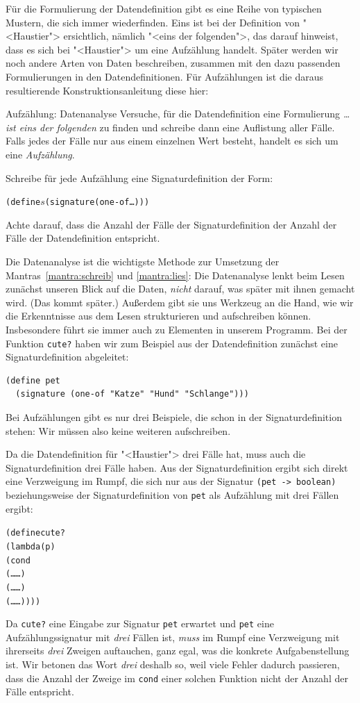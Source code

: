 Für die Formulierung der Datendefinition gibt es eine Reihe von
typischen Mustern, die sich immer wiederfinden.  Eins ist bei der
Definition von "<Haustier"> ersichtlich, nämlich "<eins der
folgenden">, das darauf hinweist, dass es sich bei "<Haustier"> um
eine Aufzählung handelt.  Später werden wir noch andere Arten
von Daten beschreiben, zusammen mit den dazu passenden Formulierungen
in den Datendefinitionen.  Für Aufzählungen
ist die daraus resultierende Konstruktionsanleitung diese hier:
%
\begin{konstruktionsanleitung}{Aufzählung: Datenanalyse}
  \label{ka:aufzaehlung}
  Versuche, für die Datendefinition eine Formulierung \emph{\ldots{}
    ist eins der folgenden} zu finden und schreibe dann eine
  Auflistung aller Fälle.  Falls jedes der Fälle nur aus einem
  einzelnen Wert besteht, handelt es sich um eine
  \textit{Aufzählung}.

  Schreibe für jede Aufzählung eine Signaturdefinition der Form:
\begin{alltt}
(define \(s\) (signature (one-of \ldots)))
\end{alltt}
  Achte darauf, dass die Anzahl der Fälle der Signaturdefinition der
  Anzahl der Fälle der Datendefinition entspricht.
\end{konstruktionsanleitung}
%
Die Datenanalyse ist die wichtigste Methode zur Umsetzung der
Mantras~\ref{mantra:schreib} und \ref{mantra:lies}:
%
\mantraschreib*
%
\mantralies*
%
\noindent Die Datenanalyse lenkt beim Lesen zunächst unseren Blick auf die
Daten, \emph{nicht} darauf, was später mit ihnen gemacht wird.  (Das
kommt später.)  Außerdem gibt sie uns Werkzeug an die Hand, wie wir
die Erkenntnisse aus dem Lesen strukturieren und aufschreiben können.
Insbesondere führt sie immer auch zu Elementen in unserem Programm.
Bei der Funktion \texttt{cute?} haben wir zum Beispiel aus der
Datendefinition zunächst eine Signaturdefinition abgeleitet:
%
\begin{verbatim}
(define pet
  (signature (one-of "Katze" "Hund" "Schlange")))
\end{verbatim}
%
Bei Aufzählungen gibt es nur drei Beispiele, die schon in der
Signaturdefinition stehen: Wir müssen also keine weiteren
aufschreiben.

Da die Datendefinition für "<Haustier"> drei Fälle hat, muss auch die
Signaturdefinition drei Fälle haben.  Aus der Signaturdefinition
ergibt sich direkt eine Verzweigung im Rumpf, die sich nur aus der
Signatur \texttt{(pet -> boolean)} beziehungsweise der
Signaturdefinition von \texttt{pet} als Aufzählung mit drei Fällen
ergibt:
%
\begin{alltt}
(define cute?
  (lambda (p)
    (cond
      (\ldots{} \ldots)
      (\ldots{} \ldots)
      (\ldots{} \ldots))))
\end{alltt}
%
Da \texttt{cute?} eine Eingabe zur Signatur \texttt{pet} erwartet und
\texttt{pet} eine Aufzählungssignatur mit \emph{drei} Fällen ist, \emph{muss}
im Rumpf eine Verzweigung mit ihrerseits \emph{drei} Zweigen
auftauchen, ganz egal, was die konkrete Aufgabenstellung ist.  Wir
betonen das Wort \emph{drei} deshalb so, weil viele Fehler dadurch
passieren, dass die Anzahl der Zweige im \texttt{cond} einer solchen
Funktion nicht der Anzahl der Fälle entspricht.

